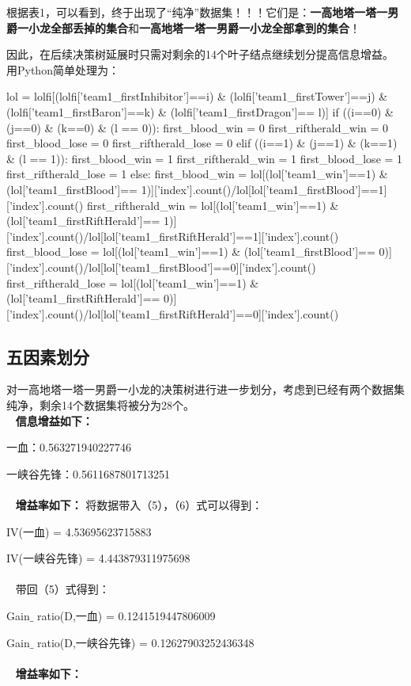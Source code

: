 \documentclass[lang=cn,11pt]{elegantpaper}
\begin{document}
根据表1，可以看到，终于出现了“纯净”数据集！！！它们是：\textbf{一高地塔一塔一男爵一小龙全部丢掉的集合}和\textbf{一高地塔一塔一男爵一小龙全部拿到的集合}！

因此，在后续决策树延展时只需对剩余的14个叶子结点继续划分提高信息增益。
用Python简单处理为：
\begin{python}
lol = lolfi[(lolfi['team1_firstInhibitor']==i) & (lolfi['team1_firstTower']==j) & (lolfi['team1_firstBaron']==k) & (lolfi['team1_firstDragon']== l)]
if ((i==0) & (j==0) & (k==0) & (l == 0)):
    first_blood_win = 0
    first_riftherald_win = 0
    first_blood_lose = 0
    first_riftherald_lose = 0
elif ((i==1) & (j==1) & (k==1) & (l == 1)):
    first_blood_win = 1
    first_riftherald_win = 1
    first_blood_lose = 1
    first_riftherald_lose = 1
else:
    first_blood_win = lol[(lol['team1_win']==1) & (lol['team1_firstBlood']== 1)]['index'].count()/lol[lol['team1_firstBlood']==1]['index'].count()
    first_riftherald_win = lol[(lol['team1_win']==1) & (lol['team1_firstRiftHerald']== 1)]['index'].count()/lol[lol['team1_firstRiftHerald']==1]['index'].count()
    first_blood_lose = lol[(lol['team1_win']==1) & (lol['team1_firstBlood']== 0)]['index'].count()/lol[lol['team1_firstBlood']==0]['index'].count()
    first_riftherald_lose = lol[(lol['team1_win']==1) & (lol['team1_firstRiftHerald']== 0)]['index'].count()/lol[lol['team1_firstRiftHerald']==0]['index'].count()
\end{python}
\subsection{五因素划分}
对一高地塔一塔一男爵一小龙的决策树进行进一步划分，考虑到已经有两个数据集纯净，剩余14个数据集将被分为28个。
\\~
\textbf{信息增益如下：}

一血：0.563271940227746

一峡谷先锋：0.5611687801713251
\\~
\\~
\textbf{增益率如下：}
将数据带入（5），（6）式可以得到：

IV(一血) = 4.53695623715883

IV(一峡谷先锋) = 4.443879311975698
\\~
\\~
带回（5）式得到：

Gain$\_$ ratio(D,一血) = 0.1241519447806009

Gain$\_$ ratio(D,一峡谷先锋) = 0.12627903252436348
\\~
\\~
\textbf{增益率如下：}
\end{document}
